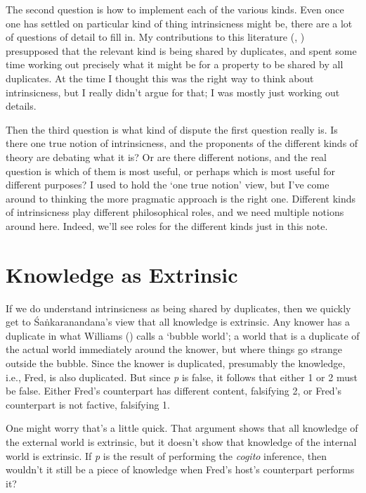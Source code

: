 \documentclass[
  11pt,
  letterpaper,
  DIV=11,
  numbers=noendperiod,
  twoside]{scrartcl}
\begin{document}
The second question is how to implement each of the various kinds. Even
once one has settled on particular kind of thing intrinsicness might be,
there are a lot of questions of detail to fill in. My contributions to
this literature (,
) presupposed that the
relevant kind is being shared by duplicates, and spent some time working
out precisely what it might be for a property to be shared by all
duplicates. At the time I thought this was the right way to think about
intrinsicness, but I really didn't argue for that; I was mostly just
working out details.

Then the third question is what kind of dispute the first question
really is. Is there one true notion of intrinsicness, and the proponents
of the different kinds of theory are debating what it is? Or are there
different notions, and the real question is which of them is most
useful, or perhaps which is most useful for different purposes? I used
to hold the `one true notion' view, but I've come around to thinking the
more pragmatic approach is the right one. Different kinds of
intrinsicness play different philosophical roles, and we need multiple
notions around here. Indeed, we'll see roles for the different kinds
just in this note.

\section{Knowledge as Extrinsic}\label{knowledge-as-extrinsic}

If we do understand intrinsicness as being shared by duplicates, then we
quickly get to Śaṅkaranandana's view that all knowledge is extrinsic.
Any knower has a duplicate in what Williams
() calls a `bubble world'; a world that
is a duplicate of the actual world immediately around the knower, but
where things go strange outside the bubble. Since the knower is
duplicated, presumably the knowledge, i.e., Fred, is also duplicated.
But since \emph{p} is false, it follows that either 1 or 2 must be
false. Either Fred's counterpart has different content, falsifying 2, or
Fred's counterpart is not factive, falsifying 1.

One might worry that's a little quick. That argument shows that all
knowledge of the external world is extrinsic, but it doesn't show that
knowledge of the internal world is extrinsic. If \emph{p} is the result
of performing the \emph{cogito} inference, then wouldn't it still be a
piece of knowledge when Fred's host's counterpart performs it?
\end{document}
